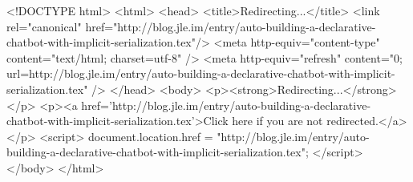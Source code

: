 <!DOCTYPE html>
<html>
<head>
<title>Redirecting...</title>
<link rel="canonical" href="http://blog.jle.im/entry/auto-building-a-declarative-chatbot-with-implicit-serialization.tex"/>
<meta http-equiv="content-type" content="text/html; charset=utf-8" />
<meta http-equiv="refresh" content="0; url=http://blog.jle.im/entry/auto-building-a-declarative-chatbot-with-implicit-serialization.tex" />
</head>
<body>
  <p><strong>Redirecting...</strong></p>
  <p><a href='http://blog.jle.im/entry/auto-building-a-declarative-chatbot-with-implicit-serialization.tex'>Click here if you are not redirected.</a></p>
  <script>
    document.location.href = "http://blog.jle.im/entry/auto-building-a-declarative-chatbot-with-implicit-serialization.tex";
  </script>
</body>
</html>

